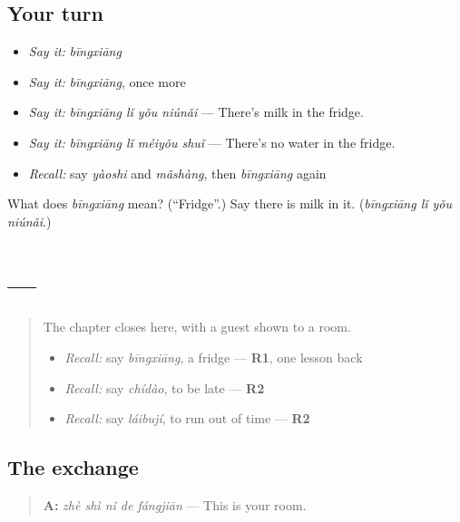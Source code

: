 \subsection*{Your turn}
\begin{itemize}
\raggedright
  \item \emph{Say it:} \emph{bīngxiāng}
  \item \emph{Say it:} \emph{bīngxiāng}, once more
  \item \emph{Say it:} \emph{bīngxiāng lǐ yǒu niúnǎi} — There's milk in the fridge.
  \item \emph{Say it:} \emph{bīngxiāng lǐ méiyǒu shuǐ} — There's no water in the fridge.
  \item \emph{Recall:} say \emph{yàoshi} and \emph{mǎshàng}, then \emph{bīngxiāng} again
\end{itemize}

\begin{tcolorbox}[breakable,colback=teal!4,colframe=teal!35!black,title={Before you move on}]
What does \emph{bīngxiāng} mean? (\textquotedblleft{}Fridge\textquotedblright{}.) Say there is milk in it. (\emph{bīngxiāng lǐ yǒu niúnǎi}.)
\end{tcolorbox}
\section[Practice]{ — }

\label{lesson:ZH-C87-practice}



\begin{quote}
The chapter closes here, with a guest shown to a room.

\begin{itemize}
\raggedright
  \item \emph{Recall:} say \emph{bīngxiāng}, a fridge — \textbf{R1}, one lesson back
  \item \emph{Recall:} say \emph{chídào}, to be late — \textbf{R2}
  \item \emph{Recall:} say \emph{láibují}, to run out of time — \textbf{R2}
\end{itemize}
\end{quote}

\subsection*{The exchange}
\begin{quote}
\textbf{A:} \emph{zhè shì nǐ de fángjiān} — This is your room.
\end{quote}

